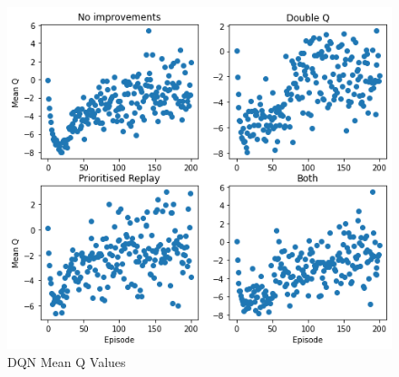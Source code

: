 \documentclass[a4pape, 11pt, english]{article}
\begin{document}
\begin{figure}[h!]
	\begin{center}
		\includegraphics{img/DQNMeanQs.png}
		\caption{DQN Mean Q Values}
		\label{fig:DQNMeanQs}
	\end{center}
\end{figure}
\end{document}

